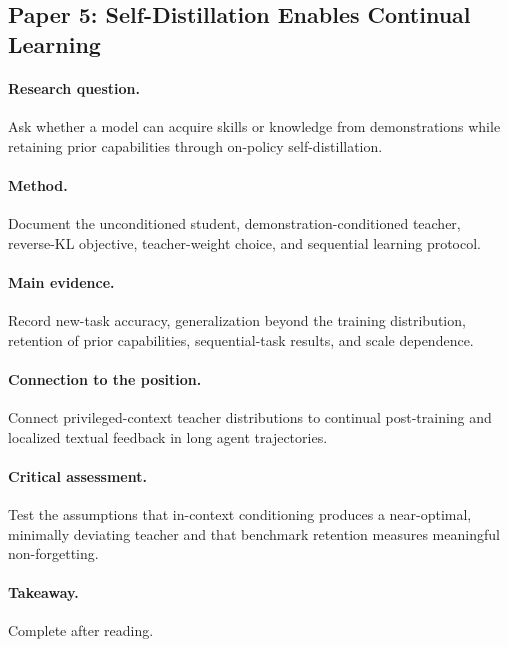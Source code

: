 \subsection{Paper 5: Self-Distillation Enables Continual Learning \citep{shenfeld2026selfdistillation}}
\paragraph{Research question.} Ask whether a model can acquire skills or knowledge from demonstrations while retaining prior capabilities through on-policy self-distillation.
\paragraph{Method.} Document the unconditioned student, demonstration-conditioned teacher, reverse-KL objective, teacher-weight choice, and sequential learning protocol.
\paragraph{Main evidence.} Record new-task accuracy, generalization beyond the training distribution, retention of prior capabilities, sequential-task results, and scale dependence.
\paragraph{Connection to the position.} Connect privileged-context teacher distributions to continual post-training and localized textual feedback in long agent trajectories.
\paragraph{Critical assessment.} Test the assumptions that in-context conditioning produces a near-optimal, minimally deviating teacher and that benchmark retention measures meaningful non-forgetting.
\paragraph{Takeaway.} Complete after reading.
